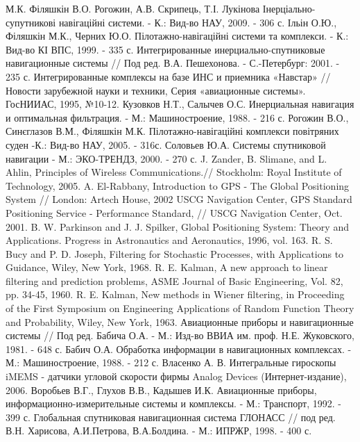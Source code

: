 \begin{thebibliography}{99}
 М.К. Філяшкін В.О. Рогожин, А.В. Скрипець, Т.І. Лукінова Інерціально-супутникові навігаційні  системи. - К.: Вид-во НАУ, 2009. - 306 с.
 Ільін О.Ю., Філяшкін М.К., Черних Ю.О. Пілотажно-навігаційні системи та комплекси. - К.: Вид-во КІ ВПС, 1999. - 335 с.
 Интегрированные инерциально-спутниковые навигационные системы // Под ред. В.А. Пешехонова. -  С.-Петербург: 2001. - 235 с.
 Интегрированные комплексы на базе ИНС и приемника «Навстар» // Новости зарубежной науки и техники, Серия «авиационные системы». ГосНИИАС, 1995, №10-12.
 Кузовков Н.Т., Салычев О.С. Инерциальная навигация и оптимальная фильтрация. - М.: Машиностроение, 1988.  - 216 с.
 Рогожин В.О., Синєглазов В.М., Філяшкін М.К. Пілотажно-навігаційні комплекси повітряних суден -К.: Вид-во НАУ, 2005. - 316с.
 Соловьев Ю.А. Системы спутниковой навигации - М.: ЭКО-ТРЕНДЗ, 2000.  - 270 с. 
 J. Zander, B. Slimane, and L. Ahlin, Principles of Wireless Communications.// Stockholm: Royal Institute of Technology, 2005.
 A. El-Rabbany, Introduction to GPS - The Global Positioning System // London: Artech House, 2002
 USCG Navigation Center, GPS Standard Positioning Service - Performance Standard, // USCG Navigation Center, Oct. 2001.
 B. W. Parkinson and J. J. Spilker, Global Positioning System: Theory and
 Applications. Progress in Astronautics and Aeronautics, 1996, vol. 163.
 R. S. Bucy and P. D. Joseph, Filtering for Stochastic Processes, with Applications to Guidance, Wiley, New York, 1968.
 R. E. Kalman, A new approach to linear filtering and prediction problems, ASME Journal of Basic Engineering, Vol. 82, pp. 34-45, 1960.
 R. E. Kalman, New methods in Wiener filtering,  in Proceeding of the First Symposium on Engineering Applications of 
Random Function Theory and Probability, Wiley, New York, 1963.
 Авиационные приборы и навигационные системы // Под  ред. Бабича О.А. - М.: Изд-во ВВИА им. проф. Н.Е. Жуковского, 1981. - 648 с.
 Бабич О.А. Обработка информации в навигационных комплексах. - М.: Машиностроение, 1988.  - 212 с.
 Власенко А. В. Интегральные гироскопы iMEMS - датчики угловой скорости фирмы Analog Devices (Интернет-издание), 2006.
 Воробьев В.Г., Глухов В.В., Кадышев И.К. Авиационные приборы, информационно-измерительные системы и комплексы. - М.: Транспорт, 1992.  - 399 с.
 Глобальная спутниковая навигационная система ГЛОНАСС // под ред. В.Н. Харисова, А.И.Петрова, В.А.Болдина. - М.: ИПРЖР, 1998.  - 400 с. 
\end{thebibliography}

